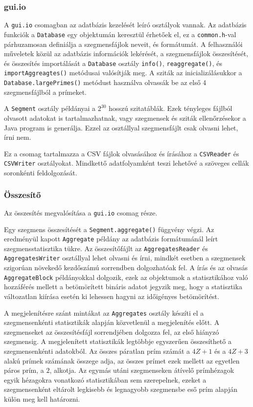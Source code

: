 \subsubsection{gui.io}

A \texttt{gui.io} csomagban az adatbázis kezelését leíró osztályok vannak.
Az adatbázis funkciók a \texttt{Database} egy objektumán keresztül érhetőek el, ez a \texttt{common.h}-val párhuzamosan definiálja a szegmensfájlok neveit, és formátumát.
A felhasználói műveletek közül az adatbázis információk lekérését, a szegmensfájlok összesítését, és összesítés importálását a \texttt{Database} osztály \texttt{info()}, \texttt{reaggregate()}, és \texttt{importAggreagtes()} metódusai valósítják meg.
A sziták az inicializálásukkor a \texttt{Database.largePrimes()} metódust használva olvassák be az első 4 szegmensfájlból a prímeket.

A \texttt{Segment} osztály példányai a $2^{30}$ hosszú szitatáblák.
Ezek tényleges fájlból olvasott adatokat is tartalmazhatnak, vagy szegmensek és sziták ellenőrzésekor a Java program is generálja.
Ezzel az osztállyal szegmensfájlt csak olvasni lehet, írni nem.

Ez a csomag tartalmazza a CSV fájlok olvasásához és írásához a \texttt{CSVReader} és \texttt{CSVWriter} osztályokat.
Mindkettő adatfolyamként teszi lehetővé a szöveges cellák soronkénti feldolgozását.

\subsubsection{Összesítő}

Az összesítés megvalósítása a \texttt{gui.io} csomag része.

Egy szegmens összesítését a \texttt{Segment.aggregate()} függvény végzi.
Az eredményül kapott \texttt{Aggregate} példány az adatbázis formátumánál leírt szegmensstatisztika tükre.
Az összesítőfájlt az \texttt{AggregatesReader} és \texttt{AggregatesWriter} osztállyal lehet olvasni és írni, mindkét esetben a szegmensek szigorúan növekedő kezdőszámú sorrendben dolgozhatóak fel.
A írás és az olvasás \texttt{AggregateBlock} példányokkal dolgozik, ezek az objektumok a statisztikához való hozzáférés mellett a betömörített bináris adatot jegyzik meg, hogy a statisztika változatlan kiírása esetén ki lehessen hagyni az időigényes betömörítést.

A megjelenítésre szánt mintákat az \texttt{Aggregates} osztály készíti el a szegmensenkénti statisztikák alapján közvetlenül a megjelenítés előtt.
A szegmenseket az összesítésfájl sorrendjében dolgozza fel, az első hiányzó szegmensig.
A megjelenített statisztikák legtöbbje egyszerűen összesíthető a szegmensenkénti adatokból.
Az összes páratlan prím számát a $4Z+1$ és a $4Z+3$ alakú prímek számának összege adja, az összes prímet ezek mellett az egyetlen páros prím, a $2$, alkotja.
Az egymás utáni szegmenseken átívelő prímhézagok egyik hézagokra vonatkozó statisztikában sem szerepelnek, ezeket a szegmensenként eltárolt legkisebb és legnagyobb szegmensbe eső prím alapján külön meg kell határozni.

